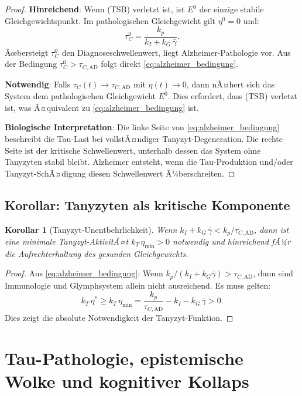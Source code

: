 ﻿\documentclass[12pt,a4paper]{article}
\newtheorem{corollary}[theorem]{Korollar}
\theoremstyle{definition}
\begin{document}
	\begin{proof}
		\textbf{Hinreichend}: Wenn (TSB) verletzt ist, ist $E^0$ der einzige stabile Gleichgewichtspunkt. Im pathologischen Gleichgewicht gilt $\eta^0 = 0$ und:
		\[
		\tau_C^0 = \frac{k_p}{k_I + k_G\,\bar{\gamma}}.
		\]
		Ãœbersteigt $\tau_C^0$ den Diagnoseschwellenwert, liegt Alzheimer-Pathologie vor. Aus der Bedingung $\tau_C^0 > \tau_{C,\text{AD}}$ folgt direkt \eqref{eq:alzheimer_bedingung}.
		
		\textbf{Notwendig}: Falls $\tau_C(t) \to \tau_{C,\text{AD}}$ mit $\eta(t) \to 0$, dann nÃ¤hert sich das System dem pathologischen Gleichgewicht $E^0$. Dies erfordert, dass (TSB) verletzt ist, was Ã¤quivalent zu \eqref{eq:alzheimer_bedingung} ist.
		
		\textbf{Biologische Interpretation}: Die linke Seite von \eqref{eq:alzheimer_bedingung} beschreibt die Tau-Last bei vollstÃ¤ndiger Tanyzyt-Degeneration. Die rechte Seite ist der kritische Schwellenwert, unterhalb dessen das System ohne Tanyzyten stabil bleibt. Alzheimer entsteht, wenn die Tau-Produktion und/oder Tanyzyt-SchÃ¤digung diesen Schwellenwert Ã¼berschreiten.
	\end{proof}
	
	\subsection{Korollar: Tanyzyten als kritische Komponente}
	
	\begin{corollary}[Tanyzyt-Unentbehrlichkeit]
		\label{cor:tanycyte_essential}
		Wenn $k_I + k_G\,\bar{\gamma} < k_p / \tau_{C,\text{AD}}$, dann ist eine minimale Tanyzyt-AktivitÃ¤t $k_T\,\eta_{\min} > 0$ notwendig und hinreichend fÃ¼r die Aufrechterhaltung des gesunden Gleichgewichts.
	\end{corollary}
	
	\begin{proof}
		Aus \eqref{eq:alzheimer_bedingung}: Wenn $k_p/(k_I + k_G\bar{\gamma}) > \tau_{C,\text{AD}}$, dann sind Immunologie und Glymphsystem allein nicht ausreichend. Es muss gelten:
		\[
		k_T\,\eta^* \geq k_T\,\eta_{\min} = \frac{k_p}{\tau_{C,\text{AD}}} - k_I - k_G\,\bar{\gamma} > 0.
		\]
		Dies zeigt die absolute Notwendigkeit der Tanyzyt-Funktion.
	\end{proof}
	
	\section{Tau-Pathologie, epistemische Wolke und kognitiver Kollaps}
	\label{sec:integration}
\end{document}
